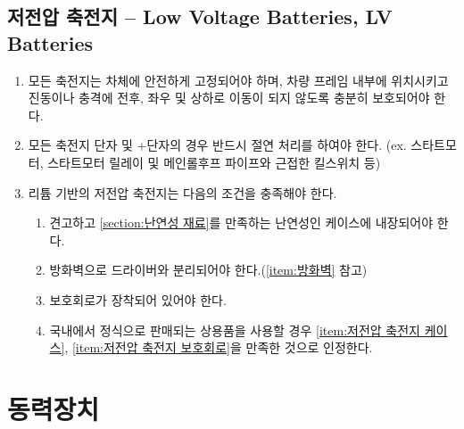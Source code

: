\documentclass[final,a4paper,10pt]{report}
\begin{document}
\section{저전압 축전지 – Low Voltage Batteries, LV Batteries} \label{section:저전압 축전지}
\begin{enumerate}
  \item 모든 축전지는 차체에 안전하게 고정되어야 하며, 차량 프레임 내부에 위치시키고 진동이나 충격에 전후, 좌우 및 상하로 이동이 되지 않도록 충분히 보호되어야 한다.
  \item 모든 축전지 단자 및 +단자의 경우 반드시 절연 처리를 하여야 한다. (ex. 스타트모터, 스타트모터 릴레이 및 메인롤후프 파이프와 근접한 킬스위치 등)
  \item 리튬 기반의 저전압 축전지는 다음의 조건을 충족해야 한다.
    \begin{enumerate}
      \item 견고하고 \cref{section:난연성 재료}를 만족하는 난연성인 케이스에 내장되어야 한다. \label{item:저전압 축전지 케이스}
      \item 방화벽으로 드라이버와 분리되어야 한다.(\cref{item:방화벽} 참고)
      \item 보호회로가 장착되어 있어야 한다. \label{item:저전압 축전지 보호회로}
      \item 국내에서 정식으로 판매되는 상용품을 사용할 경우 \cref{item:저전압 축전지 케이스}, \cref{item:저전압 축전지 보호회로}을 만족한 것으로 인정한다.
    \end{enumerate}
\end{enumerate}

\chapter{동력장치}
\end{document}
